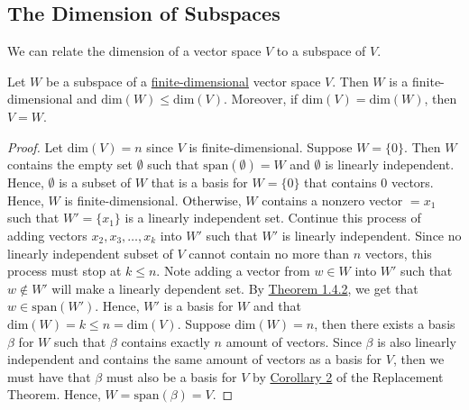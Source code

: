 \subsection{The Dimension of Subspaces}

We can relate the dimension of a vector space \( V  \) to a subspace of \( V  \).

\begin{theorem}\label{Theorem 1.11}
    Let \( W  \) be a subspace of a {\hyperref[Finite-dimensional]{finite-dimensional}} vector space \( V  \). Then \( W  \) is a finite-dimensional and \( \text{dim}(W) \leq \text{dim}(V) \). Moreover, if \( \text{dim}(V) = \text{dim}(W) \), then \( V = W  \).
\end{theorem}
\begin{proof}
    Let \( \text{dim}(V) = n  \) since \( V \) is finite-dimensional. Suppose \( W = \{ 0  \}  \). Then \( W  \) contains the empty set \( \emptyset \) such that \( \text{span}(\emptyset) = W  \) and \( \emptyset \) is linearly independent. Hence, \( \emptyset \) is a subset of \( W  \) that is a basis for \( W = \{ 0 \}  \) that contains \( 0  \) vectors. Hence, \( W  \) is finite-dimensional. Otherwise, \( W  \) contains a nonzero vector \( =  x_{1}  \) such that \(W' =  \{ x_{1} \}  \) is a linearly independent set. Continue this process of adding vectors \( x_{2}, x_{3} , \dots, x_{k } \) into \( W' \) such that \( W'  \) is linearly independent. Since no linearly independent subset of \( V  \) cannot contain no more than \( n \) vectors, this process must stop at \( k \leq  n \). Note adding a vector from \(w \in W  \) into \( W' \) such that \(w \notin W' \) will make a linearly dependent set. By {\hyperref[Theorem 1.7]{Theorem 1.4.2}}, we get that \( w \in \text{span}(W') \). Hence, \( W'  \) is a basis for \( W  \) and that \( \text{dim}(W) = k  \leq n = \text{dim}(V) \).
    Suppose \( \text{dim}(W) = n  \), then there exists a basis \( \beta \) for \( W  \)   such that \( \beta \) contains exactly \( n \) amount of vectors. Since \( \beta \) is also linearly independent and contains the same amount of vectors as a basis for \( V  \), then we must have that \( \beta \) must also be a basis for \( V  \) by {\hyperref[2nd Corollary to RT]{Corollary 2}} of the Replacement Theorem. Hence, \( W = \text{span}(\beta) = V  \). 
\end{proof}

